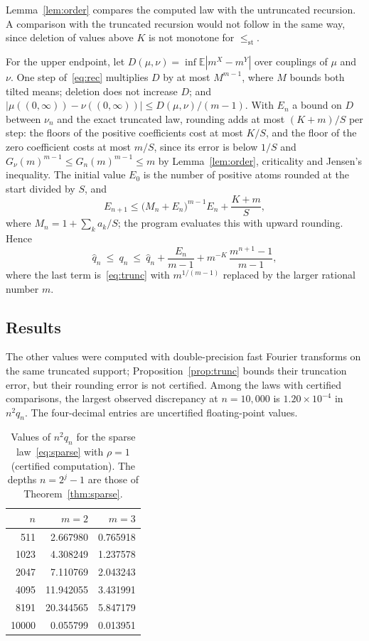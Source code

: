 \documentclass[11pt]{amsart}
\theoremstyle{remark}
\numberwithin{equation}{section}
\newcommand{\EE}{\mathbb{E}}
\begin{document}
Lemma~\ref{lem:order} compares the computed law with the untruncated recursion. A comparison with the truncated recursion would not follow in the same way, since deletion of values above $K$ is not monotone for $\le_{\mathrm{st}}$.

For the upper endpoint, let $D(\mu,\nu)=\inf\EE|m^X-m^Y|$ over couplings of $\mu$ and $\nu$. One step of~\eqref{eq:rec} multiplies $D$ by at most $M^{m-1}$, where $M$ bounds both tilted means; deletion does not increase $D$; and $|\mu((0,\infty))-\nu((0,\infty))|\le D(\mu,\nu)/(m-1)$. With $E_n$ a bound on $D$ between $\nu_n$ and the exact truncated law, rounding adds at most $(K+m)/S$ per step: the floors of the positive coefficients cost at most $K/S$, and the floor of the zero coefficient costs at most $m/S$, since its error is below $1/S$ and $G_\nu(m)^{m-1}\le G_n(m)^{m-1}\le m$ by Lemma~\ref{lem:order}, criticality and Jensen's inequality. The initial value $E_0$ is the number of positive atoms rounded at the start divided by $S$, and
\[
E_{n+1}\le\bigl(M_n+E_n\bigr)^{m-1}E_n+\frac{K+m}{S},
\]
where $M_n=1+\sum_ka_k/S$; the program evaluates this with upward rounding. Hence
\[
\widehat q_n\ \le\ q_n\ \le\ \widehat q_n+\frac{E_n}{m-1}+m^{-K}\,\frac{m^{n+1}-1}{m-1},
\]
where the last term is~\eqref{eq:trunc} with $m^{1/(m-1)}$ replaced by the larger rational number $m$.

\subsection{Results}
The other values were computed with double-precision fast Fourier transforms on the same truncated support; Proposition~\ref{prop:trunc} bounds their truncation error, but their rounding error is not certified. Among the laws with certified comparisons, the largest observed discrepancy at $n=10{,}000$ is $1.20\times10^{-4}$ in $n^2q_n$. The four-decimal entries are uncertified floating-point values.

\begin{table}[tbp]
\centering
\begin{tabular}{rrr}
\toprule
$n$ & $m=2$ & $m=3$\\
\midrule
511 & 2.667980 & 0.765918\\
1023 & 4.308249 & 1.237578\\
2047 & 7.110769 & 2.043243\\
4095 & 11.942055 & 3.431991\\
8191 & 20.344565 & 5.847179\\
10000 & 0.055799 & 0.013951\\
\bottomrule
\end{tabular}
\caption{Values of $n^2q_n$ for the sparse law~\eqref{eq:sparse} with $\rho=1$ (certified computation). The depths $n=2^j-1$ are those of Theorem~\ref{thm:sparse}.}\label{tab:spikes}
\end{table}
\end{document}
